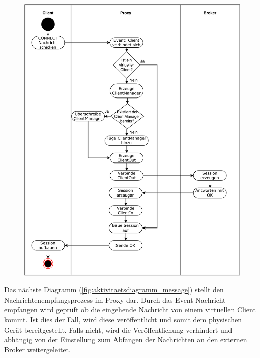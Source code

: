     \begin{figure}[!h]%
        \centering
        \includegraphics[width=14cm]{tex/bilder/4_konzept/Activity_Connect.pdf}
        \label{fig:aktivitaetsdiagramm_connect}
    \end{figure}
    \newpage
    Das nächste Diagramm (\ref{fig:aktivitaetsdiagramm_message}) stellt den Nachrichtenempfangsprozess im Proxy dar.
    Durch das Event \glqq Nachricht empfangen\grqq{} wird geprüft ob die eingehende Nachricht von einem virtuellen Client kommt. Ist dies der Fall, wird diese veröffentlicht und somit dem physischen Gerät bereitgestellt. Falls nicht, wird die Veröffentlichung verhindert und abhängig von der Einstellung zum Abfangen der Nachrichten an den externen Broker weitergeleitet.
    
